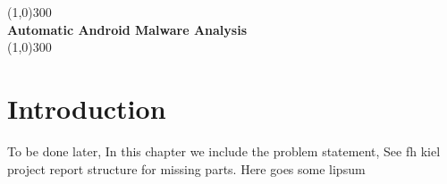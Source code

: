 \documentclass{article}
\begin{document}
	\begin{titlepage}
		\begin{center}
			\line(1,0){300}\\
			\huge{\bfseries Automatic Android Malware Analysis}\\
			\line(1,0){300}\\
		\end{center}
	\end{titlepage}
	
	
	\section{Introduction}\label{sec:intro}
	To be done later, In this chapter we include the problem statement, See fh kiel project report structure for missing parts. Here goes some lipsum 
	
\end{document}
